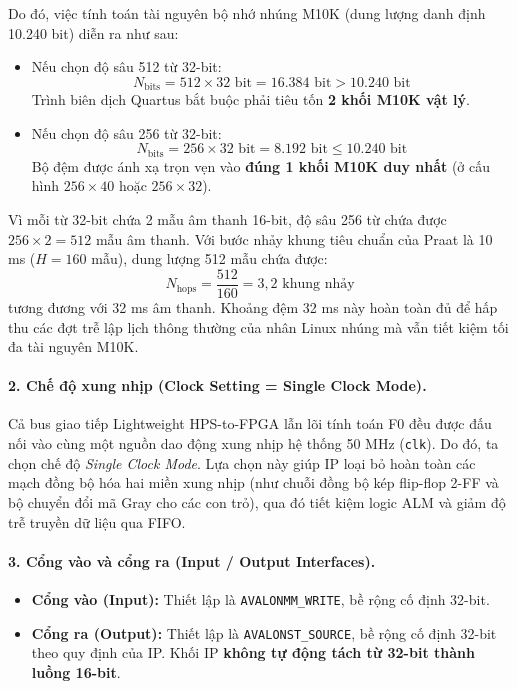 Do đó, việc tính toán tài nguyên bộ nhớ nhúng M10K (dung lượng danh định 10.240 bit) diễn ra như sau:
\begin{itemize}[leftmargin=1.5em, itemsep=2pt]
    \item Nếu chọn độ sâu 512 từ 32-bit:
    \begin{equation}
    N_{\text{bits}} = 512 \times 32\text{ bit} = 16.384\text{ bit} > 10.240\text{ bit}
    \end{equation}
    Trình biên dịch Quartus bắt buộc phải tiêu tốn \textbf{2 khối M10K vật lý}.
    \item Nếu chọn độ sâu 256 từ 32-bit:
    \begin{equation}
    N_{\text{bits}} = 256 \times 32\text{ bit} = 8.192\text{ bit} \le 10.240\text{ bit}
    \end{equation}
    Bộ đệm được ánh xạ trọn vẹn vào \textbf{đúng 1 khối M10K duy nhất} (ở cấu hình $256 \times 40$ hoặc $256 \times 32$).
\end{itemize}
Vì mỗi từ 32-bit chứa 2 mẫu âm thanh 16-bit, độ sâu 256 từ chứa được $256 \times 2 = 512$ mẫu âm thanh. Với bước nhảy khung tiêu chuẩn của Praat là 10 ms ($H = 160$ mẫu), dung lượng 512 mẫu chứa được:
\begin{equation}
N_{\text{hops}} = \frac{512}{160} = 3{,}2\text{ khung nhảy}
\end{equation}
tương đương với 32 ms âm thanh. Khoảng đệm 32 ms này hoàn toàn đủ để hấp thu các đợt trễ lập lịch thông thường của nhân Linux nhúng mà vẫn tiết kiệm tối đa tài nguyên M10K.

\paragraph{2. Chế độ xung nhịp (Clock Setting = Single Clock Mode).}
Cả bus giao tiếp Lightweight HPS-to-FPGA lẫn lõi tính toán F0 đều được đấu nối vào cùng một nguồn dao động xung nhịp hệ thống 50 MHz (\texttt{clk}). Do đó, ta chọn chế độ \emph{Single Clock Mode}. Lựa chọn này giúp IP loại bỏ hoàn toàn các mạch đồng bộ hóa hai miền xung nhịp (như chuỗi đồng bộ kép flip-flop 2-FF và bộ chuyển đổi mã Gray cho các con trỏ), qua đó tiết kiệm logic ALM và giảm độ trễ truyền dữ liệu qua FIFO.

\paragraph{3. Cổng vào và cổng ra (Input / Output Interfaces).}
\begin{itemize}[leftmargin=1.5em, itemsep=2pt]
    \item \textbf{Cổng vào (Input):} Thiết lập là \texttt{AVALONMM\_WRITE}, bề rộng cố định 32-bit.
    \item \textbf{Cổng ra (Output):} Thiết lập là \texttt{AVALONST\_SOURCE}, bề rộng cố định 32-bit theo quy định của IP. Khối IP \textbf{không tự động tách từ 32-bit thành luồng 16-bit}.
\end{itemize}

